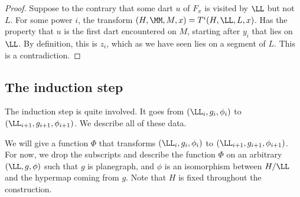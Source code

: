 \begin{lemma}
\begin{lemma}
\begin{proof}  Suppose to the contrary that some dart $u$ of $F_x$ is
visited by $\LL$ but not $L$.  For some power $i$, the transform
$(H,\MM,M,x) = T^i(H,\LL,L,x)$. Has the property that $u$ is
the first dart encountered on $M$, starting after $y_i$ that lies on $\LL$.
By definition, this is $z_i$, which as we have seen lies on a segment of
$L$.  This is a contradiction.
\end{proof}








\subsection{The induction step}

The induction step is quite involved.  It goes from
$(\LL_i,g_i,\phi_i)$ to $(\LL_{i+1},g_{i+1},\phi_{i+1})$.
We describe all of these data.

We will give a function $\Phi$ that transforms $(\LL_i,g_i,\phi_i)$ to
$(\LL_{i+1},g_{i+1},\phi_{i+1})$.  For now, we drop the subscripts and
describe the function $\Phi$ on an arbitrary $(\LL,g,\phi)$ such that
$g$ is planegraph, and $\phi$ is an isomorphism between $H/\LL$ and
the hypermap coming from $g$.  Note that $H$ is fixed throughout the
construction.


\end{lemma}
\end{lemma}
